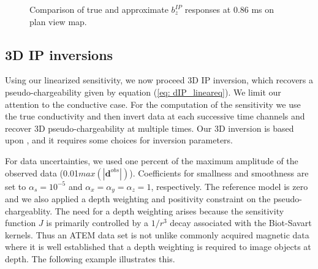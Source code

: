 \documentclass[extra,mreferee]{gji}
\begin{document}
\begin{figure}
  \caption{Comparison of true and approximate $b_z^{IP}$ responses at 0.86 ms on plan view map. }
  \label{F:EquivPeta_True_Approx}
\end{figure}
\clearpage

\subsection{3D IP inversions}
Using our linearized sensitivity, we now proceed 3D IP inversion, which recovers a pseudo-chargeability given by equation (\ref{eq: dIP_lineareq}). 
We limit our attention to the conductive case. For the computation of the sensitivity we use the true conductivity and then invert data at each  successive time channels and recover 3D pseudo-chargeability at multiple times. 
Our 3D inversion is based upon \cite[]{doug1994,Li2000}, and it requires some choices for inversion parameters. 

For data uncertainties, we used one percent of the maximum amplitude of the observed data (0.01$max(|\mathbf{d}^{obs}|)$). Coefficients for smallness and smoothness are set to $\alpha_s=10^{-5}$ and $\alpha_x=\alpha_y=\alpha_z=1$, respectively. The reference model is zero and we also applied a depth weighting and positivity constraint on the pseudo-chargeablity. 
The need for a depth weighting arises because the sensitivity function $J$ is primarily controlled by a $1/r^3$ decay associated with the Biot-Savart kernels.  Thus an ATEM data set is not unlike commonly acquired  magnetic data where it is well established that a depth weighting is required to image objects at depth. The following example illustrates this. 
\end{document}
